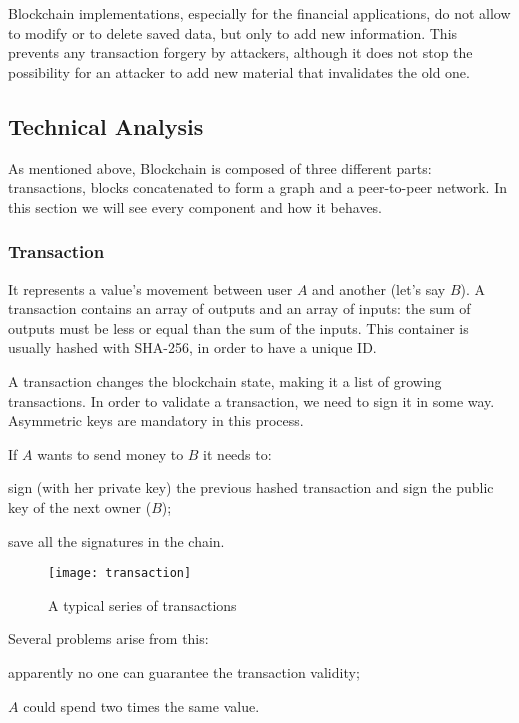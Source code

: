 Blockchain implementations, especially for the financial applications, do not
allow to modify or to delete saved data, but only to add new information. This
prevents any transaction forgery by attackers, although it does not stop the
possibility for an attacker to add new material that invalidates the old one.

\subsection{Technical Analysis}

As mentioned above, Blockchain is composed of three different
parts\cite{sok15}: transactions, blocks concatenated to form a graph and a
peer-to-peer network. In this section we will see every component and how it 
behaves.

\subsubsection{Transaction}
It represents a value's movement between user $A$ and another (let's
say $B$). A transaction contains an array of outputs and an array of
inputs\cite{sok15}: the sum of outputs must be less or equal than the sum of
the inputs.
This container is usually hashed with SHA-256, in order to have a
unique ID.

A transaction changes the blockchain state, making it a list of growing
transactions.
In order to validate a transaction, we need to sign it in some way. Asymmetric
keys are mandatory in this process.

If $A$ wants to send money to $B$ it needs to:
\begin{enumerate*}[label=\roman*)]
 \item sign (with her private key) the previous hashed transaction and sign the
public key of the next owner ($B$);
 \item save all the signatures in the chain.
\end{enumerate*}

\begin{figure}[ht]
 \centering
 \texttt{[image: transaction]}
 \caption{A typical series of transactions}
\end{figure}

Several problems arise from this:
\begin{enumerate*}[label=\roman*)]
 \item apparently no one can guarantee the transaction validity;
 \item $A$ could spend two times the same value.
\end{enumerate*}

